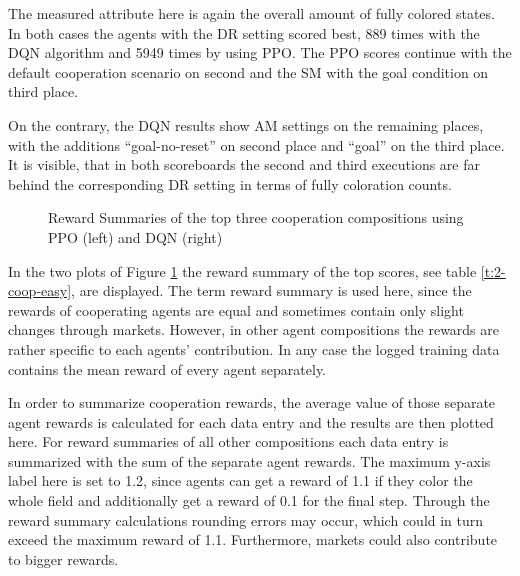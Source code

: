 The measured attribute here is again the overall amount of fully colored states. In both cases the agents with the DR setting scored best, 889 times with the DQN algorithm and 5949 times by using PPO. The PPO scores continue with the default cooperation scenario on second and the SM with the goal condition on third place. 

On the contrary, the DQN results show AM settings on the remaining places, with the additions ``goal-no-reset'' on second place and ``goal'' on the third place. It is visible, that in both scoreboards the second and third executions are far behind the corresponding DR setting in terms of fully coloration counts.

\begin{figure}[hpbt]
    \centering
    \hspace{0.01\textwidth}
    \caption[Reward Summaries of the Top Cooperation Modes]{Reward Summaries of the top three cooperation compositions using PPO (left) and DQN (right)}
    \label{fig:multipic_plots_coop_easy} %
\end{figure}

In the two plots of Figure \ref{fig:multipic_plots_coop_easy} the reward summary of the top scores, see table \ref{t:2-coop-easy}, are displayed. The term reward summary is used here, since the rewards of cooperating agents are equal and sometimes contain only slight changes through markets. However, in other agent compositions the rewards are rather specific to each agents' contribution. In any case the logged training data contains the mean reward of every agent separately. 

In order to summarize cooperation rewards, the average value of those separate agent rewards is calculated for each data entry and the results are then plotted here. For reward summaries of all other compositions each data entry is summarized with the sum of the separate agent rewards. The maximum y-axis label here is set to 1.2, since agents can get a reward of 1.1 if they color the whole field and additionally get a reward of 0.1 for the final step. Through the reward summary calculations rounding errors may occur, which could in turn exceed the maximum reward of 1.1. Furthermore, markets could also contribute to bigger rewards. 

